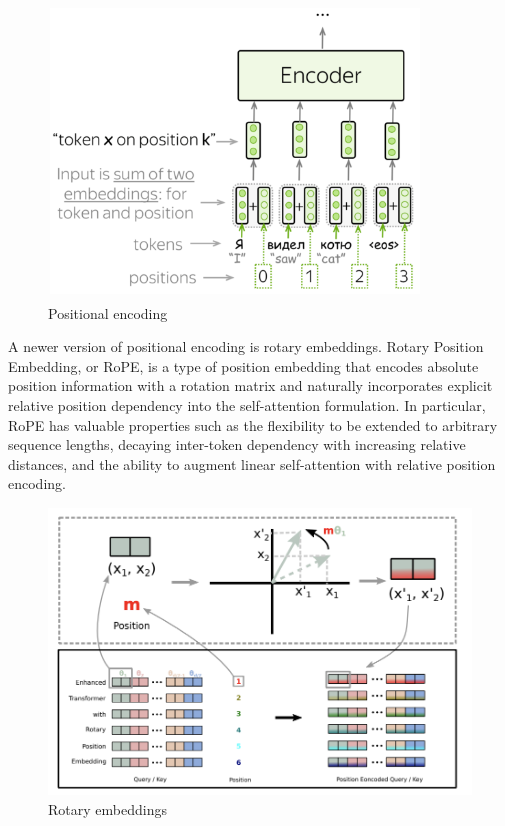 \documentclass[PMI,VKR]{HSEUniversity}
\begin{document}
\begin{figure}[h]
    \centering
    \includegraphics[scale=1]{img/pos_encoding.png}
    \caption{Positional encoding}
\end{figure}

A newer version of positional encoding is rotary embeddings.
Rotary Position Embedding, or RoPE, is a type of position embedding that encodes absolute position information with a rotation matrix and naturally incorporates explicit relative position dependency into the self-attention formulation. 
In particular, RoPE has valuable properties such as the flexibility to be extended to arbitrary sequence lengths, decaying inter-token dependency with increasing relative distances, and the ability to augment linear self-attention with relative position encoding. 

\begin{figure}[h]
    \centering
    \includegraphics[scale=0.7]{img/rotary_embs.png}
    \caption{Rotary embeddings}
\end{figure}
\end{document}
